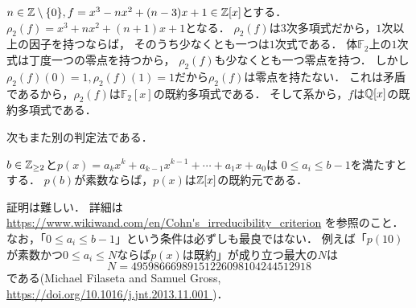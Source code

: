 \documentclass[a4j]{jsarticle}
\begin{document}
\begin{Example}
    $n \in \mathbb{Z} \setminus \{0\}, f=x^3-nx^2+(n-3)x+1 \in \mathbb{Z}[x]$とする．
    $\rho_2(f)=x^3+nx^2+(n+1)x+1$となる．
    $\rho_2(f)$は$3$次多項式だから，$1$次以上の因子を持つならば，
    そのうち少なくとも一つは$1$次式である．
    体$\mathbb{F}_2$上の$1$次式は丁度一つの零点を持つから，
    $\rho_2(f)$も少なくとも一つ零点を持つ．
    しかし$\rho_2(f)(0)=1, \rho_2(f)(1)=1$だから$\rho_2(f)$は零点を持たない．
    これは矛盾であるから，$\rho_2(f)$は$\mathbb{F}_2[x]$の既約多項式である．
    そして系から，$f$は$\mathbb{Q}[x]$の既約多項式である．
\end{Example}

次もまた別の判定法である．
\begin{Thm}
    $b \in \mathbb{Z}_{\geq 2}$と$p(x)=a_{k}x^{k}+a_{k-1}x^{k-1}+\cdots +a_{1}x+a_{0}$は
    $0 \leq a_{i}\leq b-1$を満たすとする．
    $p(b)$が素数ならば，$p(x)$は$\mathbb{Z}[x]$の既約元である．
\end{Thm}
証明は難しい．
詳細は\url{https://www.wikiwand.com/en/Cohn's_irreducibility_criterion} を参照のこと．
なお，「$0 \leq a_{i} \leq b-1$」という条件は必ずしも最良ではない．
例えば「$p(10)$が素数かつ$0 \leq a_{i} \leq N$ならば$p(x)$は既約」が成り立つ最大の$N$は
\[ N=49598666989151226098104244512918 \]
である(Michael Filaseta and Samuel Gross, \url{ https://doi.org/10.1016/j.jnt.2013.11.001 })．
\end{document}
